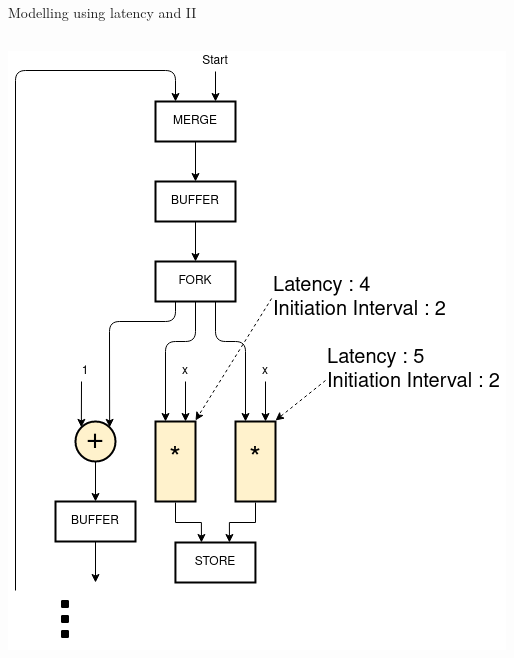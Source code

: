 \documentclass{beamer}
\begin{document}
\begin{frame}{Modelling using latency and II}
\begin{columns}[T]
\begin{column}{0.25\textwidth}
\begin{center}
      \includegraphics[scale=0.25]{latency_shared.png}
    \end{center}
    \end{column}
  \end{columns}
\end{frame}
\end{document}
